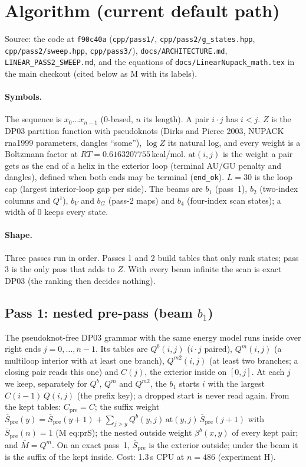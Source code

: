 \documentclass[11pt]{article}
\begin{document}
\section{Algorithm (current default path)}
Source: the code at \texttt{f90c40a} (\texttt{cpp/pass1/}, \texttt{cpp/pass2/g\_states.hpp}, \texttt{cpp/pass2/sweep.hpp}, \texttt{cpp/pass3/}), \texttt{docs/ARCHITECTURE.md}, \texttt{LINEAR\_PASS2\_SWEEP.md}, and the equations of \texttt{docs/LinearNupack\_math.tex} in the main checkout (cited below as M with its labels).

\paragraph{Symbols.} The sequence is $x_0\dots x_{n-1}$ (0-based, $n$ its length). A pair $i\cdot j$ has $i<j$. $Z$ is the DP03 partition function with pseudoknots (Dirks and Pierce 2003, NUPACK rna1999 parameters, dangles ``some''), $\log Z$ its natural log, and every weight is a Boltzmann factor at $RT=0.6163207755$\,kcal/mol. $\mathrm{at}(i,j)$ is the weight a pair gets as the end of a helix in the exterior loop (terminal AU/GU penalty and dangles), defined when both ends may be terminal (\texttt{end\_ok}). $L=30$ is the loop cap (largest interior-loop gap per side). The beams are $b_1$ (pass~1), $b_2$ (two-index columns and $Q^z$), $b_V$ and $b_G$ (pass-2 maps) and $b_4$ (four-index scan states); a width of 0 keeps every state.

\paragraph{Shape.} Three passes run in order. Passes 1 and 2 build tables that only rank states; pass 3 is the only pass that adds to $Z$. With every beam infinite the scan is exact DP03 (the ranking then decides nothing).

\subsection*{Pass 1: nested pre-pass (beam $b_1$)}
The pseudoknot-free DP03 grammar with the same energy model runs inside over right ends $j=0,\dots,n-1$. Its tables are $Q^b(i,j)$ ($i\cdot j$ paired), $Q^m(i,j)$ (a multiloop interior with at least one branch), $Q^{m2}(i,j)$ (at least two branches; a closing pair reads this one) and $C(j)$, the exterior inside on $[0,j]$. At each $j$ we keep, separately for $Q^b$, $Q^m$ and $Q^{m2}$, the $b_1$ starts $i$ with the largest $C(i-1)\,Q(i,j)$ (the prefix key); a dropped start is never read again. From the kept tables: $C_{\mathrm{pre}}=C$; the suffix weight $\bar S_{\mathrm{pre}}(y)=\bar S_{\mathrm{pre}}(y+1)+\sum_{j>y}Q^b(y,j)\,\mathrm{at}(y,j)\,\bar S_{\mathrm{pre}}(j+1)$ with $\bar S_{\mathrm{pre}}(n)=1$ (M eq:prS); the nested outside weight $\beta^b(x,y)$ of every kept pair; and $\bar M=Q^m$. On an exact pass~1, $\bar S_{\mathrm{pre}}$ is the exterior outside; under the beam it is the suffix of the kept inside. Cost: 1.3\,s CPU at $n=486$ (experiment H).
\end{document}
